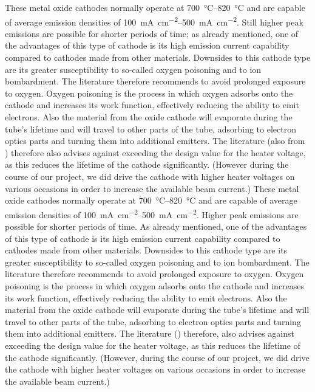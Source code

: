These metal oxide cathodes normally operate at \SIrange{700}{820}{\celsius} and are capable of average emission densities of \SIrange{100}{500}{\milli\ampere\per\centi\meter\squared}. Still higher peak emissions are possible for shorter periods of time; as already mentioned, one of the advantages of this type of cathode is its high emission current capability compared to cathodes made from other materials. Downsides to this cathode type are its greater susceptibility to so-called oxygen poisoning and to ion bombardment. The literature therefore recommends to avoid prolonged exposure to oxygen. Oxygen poisoning is the process in which oxygen adsorbs onto the cathode and increases its work function, effectively reducing the ability to emit electrons. 
Also the material from the oxide cathode will evaporate during the tube's lifetime and will travel to other parts of the tube, adsorbing to electron optics parts and turning them into additional emitters. The literature (also from \cite[chp 3.5.2.1]{Whitaker}) therefore also advises against exceeding the design value for the heater voltage, as this reduces the lifetime of the cathode significantly. (However during the course of our project, we did drive the cathode with higher heater voltages on various occasions in order to increase the available beam current.)
These metal oxide cathodes normally operate at \SIrange{700}{820}{\celsius} and are capable of average emission densities of \SIrange{100}{500}{\milli\ampere\per\centi\meter\squared}. Higher peak emissions are possible for shorter periods of time. As already mentioned, one of the advantages of this type of cathode is its high emission current capability compared to cathodes made from other materials. Downsides to this cathode type are its greater susceptibility to so-called oxygen poisoning and to ion bombardment. The literature therefore recommends to avoid prolonged exposure to oxygen. Oxygen poisoning is the process in which oxygen adsorbs onto the cathode and increases its work function, effectively reducing the ability to emit electrons. 
Also the material from the oxide cathode will evaporate during the tube's lifetime and will travel to other parts of the tube, adsorbing to electron optics parts and turning them into additional emitters. The literature (\cite[chp 3.5.2.1]{Whitaker}) therefore, also advises against exceeding the design value for the heater voltage, as this reduces the lifetime of the cathode significantly. (However, during the course of our project, we did drive the cathode with higher heater voltages on various occasions in order to increase the available beam current.) 

